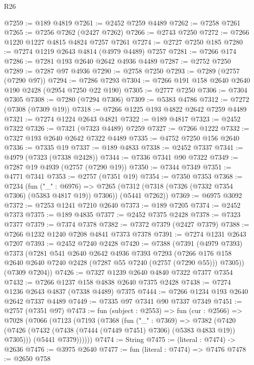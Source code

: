 \begin{lexlean}{R26}
\begin{coremodule}
@7259 := @189 @4819
@7261 := @2452 @7259 @4489
@7262 := @7258 @7261
@7265 := @7256 @7262 (@2427 @7262)
@7266 := @2743 @7250
@7272 := @7266 @1220 @1227 @4815 @4824 @7257 @7261
@7274 := @2727 @7250 @185
@7280 := @7274 @1219 @2643 @4814 (@4979 @4489) @7257
@7281 := @7266 @174
@7286 := @7281 @193 @2640 @2642 @4936 @4489
@7287 := @2752 @7250
@7289 := @7287 @97 @4936
@7290 := @2758 @7250
@7293 := @7289 (@2757 (@7290 @97))
@7294 := @7286 @7293
@7304 := @7266 @191 @158 @2640 @2640 @190 @2428 (@2954 @7250 @22 @190)
@7305 := @2777 @7250
@7306 := @7304 @7305
@7308 := @7280 (@7294 @7306)
@7309 := @5383 @4786
@7312 := @7272 (@7308 (@7309 @19))
@7318 := @7266 @1225 @193 @4822 @2642 @7259 @4489
@7321 := @7274 @1224 @2643 @4821
@7322 := @189 @4817
@7323 := @2452 @7322
@7326 := @7321 (@7323 @4489) @7259
@7327 := @7266 @1222
@7332 := @7327 @193 @2640 @2642 @7322 @4489
@7335 := @4752 @7250 @156 @2640
@7336 := @7335 @19
@7337 := @189 @4833
@7338 := @2452 @7337
@7341 := @4979 (@7323 (@7338 @2428))
@7344 := @7336 @7341 @90 @7322
@7349 := @7287 @19 @4939 (@2757 (@7290 @19))
@7350 := @7344 @7349
@7351 := @4771 @7341
@7353 := @2757 (@7351 @19)
@7354 := @7350 @7353
@7368 := @7234
    (fun ("_" : @6976) =>
    @7265 (@7312 (@7318 (@7326 (@7332 @7354 @7306) (@5383 @4817 @19)) @7306)) (@5441 @7262))
@7369 := @6975 @3092
@7372 := @7253 @1241 @7210 @2640
@7373 := @189 @7205
@7374 := @2452 @7373
@7375 := @189 @4835
@7377 := @2452 @7375 @2428
@7378 := @7323 @7377
@7379 := @7374 @7378
@7382 := @7372 @7379 (@2427 @7379)
@7388 := @7266 @1232 @1240 @7208 @4841 @7373 @7378
@7391 := @7274 @1231 @2643 @7207
@7393 := @2452 @7240 @2428
@7420 := @7388
    (@7391
      (@4979 @7393)
      @7373
      (@7281
        @541
        @2640
        @2642
        @4936
        @7393
        @7293
        (@7266 @176 @158 @2640 @2640 @7240 @2428 (@7287 @55 @7240 (@2757 (@7290 @55))) @7305))
      (@7309 @7204))
@7426 := @7327 @1239 @2640 @4840 @7322 @7377 @7354
@7432 := @7266 @1237 @158 @4838 @2640 @7375 @2428
@7438 := @7274 @1236 @2643 @4837 (@7338 @4489) @7375
@7444 := @7266 @1234 @193 @2640 @2642 @7337 @4489
@7449 := @7335 @97 @7341 @90 @7337 @7349
@7451 := @2757 (@7351 @97)
@7473 := fun (subject : @2553) =>
  fun (cur : @2566) =>
  @7028
    (@7066
      (@7123
        (@7193
          (@7368
            (fun ("_" : @7369) =>
            @7382
              (@7420 (@7426 (@7432 (@7438 (@7444 (@7449 @7451) @7306) (@5383 @4833 @19)) @7305)))
              (@5441 @7379))))))
@7474 := String
@7475 := (literal : @7474) -> @2636
@7476 := @3975 @2640
@7477 := fun (literal : @7474) => @7476
@7478 := @2650 @758

\end{coremodule}
\end{lexlean}
